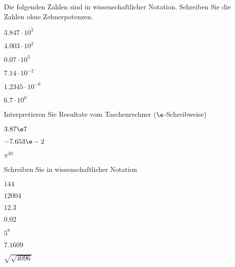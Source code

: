 \platzFuerBerechnungenBisEndeSeite{}
\TRAINER{\newpage}

Die folgenden Zahlen sind in wissenschaftlicher Notation. Schreiben
Sie die Zahlen ohne Zehnerpotenzen.

\begin{bbwAufgabenBlock}
\item $3.847 \cdot{} 10^3$ 
\item $4.003\cdot{} 10^2$ 
\item $0.07\cdot{}10^3$ 
\item $7.14\cdot{}10^{-2}$
\item $1.2345\cdot{}10^{-6}$ 
\item $6.7\cdot{}10^0$ 
\end{bbwAufgabenBlock}

\platzFuerBerechnungenBisEndeSeite{}

Interpretieren Sie Resultate vom Taschenrechner ($\e$-Schreibweise)

\begin{bbwAufgabenBlock}
\item $3.87\e7$ 
\item $-7.653\e-2$ 
\item $\pi^{30}$ 
\end{bbwAufgabenBlock}

\platzFuerBerechnungenBisEndeSeite{}

Schreiben Sie in wissenschaftlicher Notation

\begin{bbwAufgabenBlock}
\item $144$ 
\item $12004$ 
\item $12.3$ 
\item $0.02$ 
\item $5^8$ 
\item $7.1609$ 
\item $\sqrt{\sqrt{4096}}$ 
\end{bbwAufgabenBlock}

